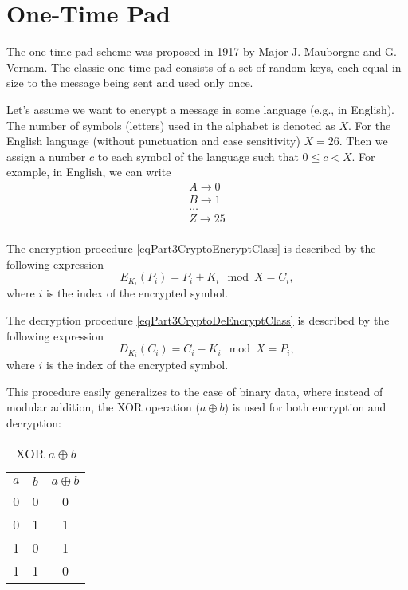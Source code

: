 \section{One-Time Pad}
The one-time pad scheme was proposed in 1917 by Major J. Mauborgne and G. Vernam. The classic one-time pad consists of a set of random keys, each equal in size to the message being sent and used only once.

Let's assume we want to encrypt a message in some language (e.g., in English). The number of symbols (letters) used in the alphabet is denoted as $X$. For the English language (without punctuation and case sensitivity) $X = 26$. Then we assign a number $c$ to each symbol of the language such that $0 \le c < X$. For example, in English, we can write
\begin{equation}
\begin{array}{c}
A \rightarrow 0 \\
B \rightarrow 1 \\
\dots \\
Z \rightarrow 25 \\
\end{array}
\nonumber
\end{equation}
  
The encryption procedure \eqref{eqPart3CryptoEncryptClass} is described by the following expression
\begin{equation}
E_{K_i}\left(P_i\right) = P_i + K_i \mod X = C_i,
\label{eqPart3CryptoEncryptVernam}
\end{equation}
where $i$ is the index of the encrypted symbol.

The decryption procedure \eqref{eqPart3CryptoDeEncryptClass} is described by the following expression
\begin{equation}
D_{K_i}\left(C_i\right) = C_i - K_i \mod X = P_i,
\label{eqPart3CryptoDeEncryptVernam}
\end{equation}
where $i$ is the index of the encrypted symbol.

This procedure easily generalizes to the case of binary data, where instead of modular addition, the XOR operation ($a \oplus b$) is used for both encryption and decryption:
\begin{table}
\centering
\begin{tabular}{|c|c|c|}
\hline
$a$ & $b$ & $a \oplus b$ \\ \hline
0  & 0 & 0 \\
0  & 1 & 1 \\
1  & 0 & 1 \\
1  & 1 & 0 \\ \hline
\end{tabular}
\caption{XOR $a \oplus b$}
\label{tblXOR}
\end{table}

